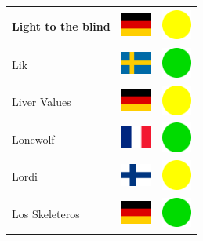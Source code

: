 \documentclass[12pt, a4paper, twoside]{report}
\begin{document}
\begin{center}
\begin{longtable}{|p{5cm}|p{2cm}|p{2cm}|}
Light to the blind & \includegraphics[width=1cm]{4x3/de} & \includegraphics[width=1cm]{likes/m} \\ \hline
Lik & \includegraphics[width=1cm]{4x3/se} & \includegraphics[width=1cm]{likes/y} \\ \hline
Liver Values & \includegraphics[width=1cm]{4x3/de} & \includegraphics[width=1cm]{likes/m} \\ \hline
Lonewolf & \includegraphics[width=1cm]{4x3/fr} & \includegraphics[width=1cm]{likes/y} \\ \hline
Lordi & \includegraphics[width=1cm]{4x3/fi} & \includegraphics[width=1cm]{likes/m} \\ \hline
Los Skeleteros & \includegraphics[width=1cm]{4x3/de} & \includegraphics[width=1cm]{likes/y} \\ \hline

\end{longtable}
\end{center}
\end{document}
